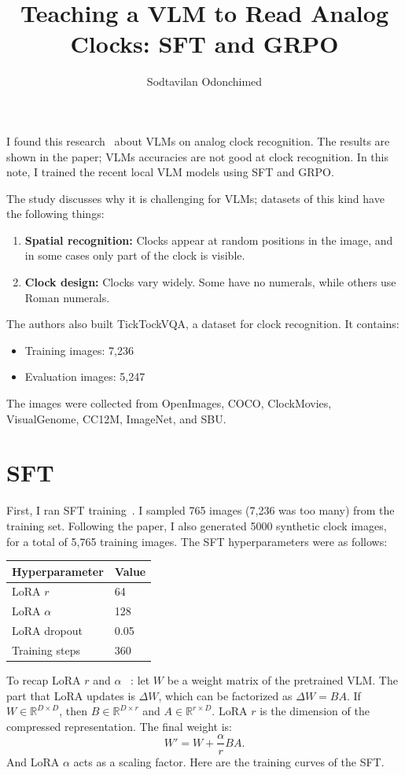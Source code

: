 \documentclass[11pt]{article}
\title{Teaching a VLM to Read Analog Clocks: SFT and GRPO}
\author{Sodtavilan Odonchimed}
\date{}
\begin{document}
\maketitle


I found this research~\citep{choi2026itstimerightimproving} about VLMs on analog clock recognition. The results are shown in the paper; VLMs accuracies are not good at clock recognition. In this note, I trained the recent local VLM models using SFT and GRPO.

The study discusses why it is challenging for VLMs; datasets of this kind have the following things:
\begin{enumerate}
    \item \textbf{Spatial recognition:} Clocks appear at random positions in the image, and in some cases only part of the clock is visible.
    \item \textbf{Clock design:} Clocks vary widely. Some have no numerals, while others use Roman numerals.
\end{enumerate}
The authors also built TickTockVQA, a dataset for clock recognition. It contains:
\begin{itemize}
    \item Training images: 7,236
    \item Evaluation images: 5,247
\end{itemize}
The images were collected from OpenImages, COCO, ClockMovies, VisualGenome, CC12M, ImageNet, and SBU.


\section{SFT}
First, I ran SFT training~\citep{pareja2024unveilingsecretrecipeguide}. I sampled 765 images (7,236 was too many) from the training set. Following the paper, I also generated 5000 synthetic clock images, for a total of 5,765 training images.
The SFT hyperparameters were as follows:
\begin{table}[h]
\centering
\begin{tabular}{ll}
\hline
\textbf{Hyperparameter} & \textbf{Value} \\
\hline
LoRA $r$ & 64 \\
LoRA $\alpha$ & 128 \\
LoRA dropout & 0.05 \\
Training steps & 360 \\
\hline
\end{tabular}
\end{table}
To recap LoRA $r$ and $\alpha$ ~\citep{hu2021loralowrankadaptationlarge}: let $W$ be a weight matrix of the pretrained VLM. The part that LoRA updates is $\Delta W$, which can be factorized as $\Delta W = BA$. If $W \in \mathbb{R}^{D \times D}$, then $B \in \mathbb{R}^{D \times r}$ and $A \in \mathbb{R}^{r \times D}$. LoRA $r$ is the dimension of the compressed representation. The final weight is:
$$W' = W + \frac{\alpha}{r}BA.$$
And LoRA $\alpha$ acts as a scaling factor. Here are the training curves of the SFT. 
\end{document}
